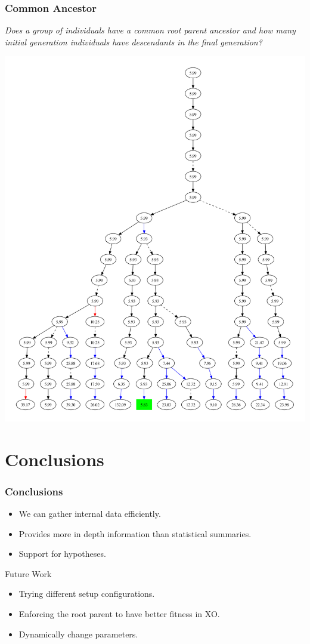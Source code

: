 \documentclass{beamer}
\newcommand{\linespace}{\vskip 0.25cm}
\begin{document}
\begin{frame}
\frametitle{Common Ancestor}
\emph{Does a group of individuals have a common root parent ancestor and how many initial generation individuals have descendants in the final generation?}
\begin{center}
\includegraphics[height=0.70\textheight]{subset_confluence_trimmed}
\end{center}

\end{frame}

\section[Conclusions]{Conclusions}

\begin{frame}
\frametitle{Conclusions}

\begin{itemize}
\item We can gather internal data efficiently.
\item Provides more in depth information than statistical summaries. 
\item Support for hypotheses.
\end{itemize}
\linespace
\linespace
\linespace
\linespace

Future Work
\begin{itemize}
\item Trying different setup configurations.
\item Enforcing the root parent to have better fitness in XO.
\item Dynamically change parameters.
\end{itemize}
\end{frame}
\end{document}
